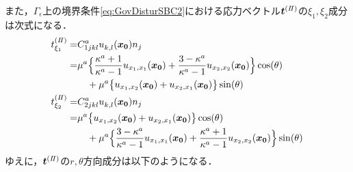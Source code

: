 また，$\Gamma_\epsilon$上の境界条件\eqref{eq:GovDisturSBC2}における応力ベクトル$\bm{t}^{(I\hspace{-.15em}I)}$の$\xi_1,\xi_2$成分は次式になる．
\begin{align}
	t_{\xi_1}^{(I\hspace{-.15em}I)}=&C_{1jkl}^{a}u_{k,l}^{}(\bm{x_{0}})n_{j}
		\nonumber
		\\
		=&\mu^a\Bigl\{\frac{\kappa^a+1}{\kappa^a-1} u_{x_{1},x_{1}}(\bm{x_{0}})
		+\frac{3-\kappa^a}{\kappa^a-1} u_{x_{2},x_{2}}(\bm{x_{0}})\Bigr\}\cos(\theta)
		\nonumber
		\\
		&\quad+\mu^a\bigl\{u_{x_{1},x_{2}}(\bm{x_{0}})+u_{x_{2},x_{1}}(\bm{x_{0}})\bigr\}\sin(\theta)
	\\
	t_{\xi_2}^{(I\hspace{-.15em}I)}=&C_{2jkl}^{a}u_{k,l}^{}(\bm{x_{0}})n_{j}
		\nonumber
		\\
		=&\mu^a \bigl\{u_{x_{1},x_{2}}(\bm{x_{0}})+u_{x_{2},x_{1}}(\bm{x_{0}})\bigr\}\cos(\theta)
		\nonumber
		\\
		&\quad+\mu^a\Bigl\{ \frac{3-\kappa^a}{\kappa^a-1} u_{x_{1},x_{1}}(\bm{x_{0}})
		+\frac{\kappa^a+1}{\kappa^a-1} u_{x_{2},x_{2}}(\bm{x_{0}})\Bigr\}\sin(\theta)
\end{align}
ゆえに，$\bm{t}^{(I\hspace{-.15em}I)}$の$r,\theta$方向成分は以下のようになる．
